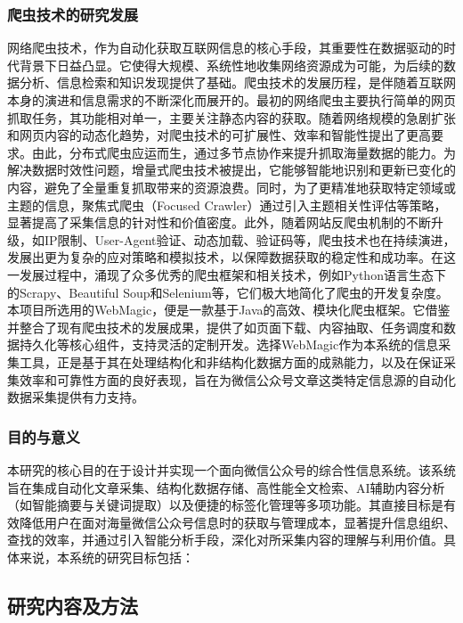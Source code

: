 \documentclass[a4paper,12pt]{ctexart}
\newcommand{\wuhao}{\fontsize{10.5pt}{15.75pt}\selectfont} %
\begin{document}
\subsubsection{爬虫技术的研究发展}
\songti\wuhao
网络爬虫技术，作为自动化获取互联网信息的核心手段，其重要性在数据驱动的时代背景下日益凸显。它使得大规模、系统性地收集网络资源成为可能，为后续的数据分析、信息检索和知识发现提供了基础。爬虫技术的发展历程，是伴随着互联网本身的演进和信息需求的不断深化而展开的。最初的网络爬虫主要执行简单的网页抓取任务，其功能相对单一，主要关注静态内容的获取\cite{ref5}。随着网络规模的急剧扩张和网页内容的动态化趋势，对爬虫技术的可扩展性、效率和智能性提出了更高要求。由此，分布式爬虫应运而生，通过多节点协作来提升抓取海量数据的能力\cite{ref3}。为解决数据时效性问题，增量式爬虫技术被提出，它能够智能地识别和更新已变化的内容，避免了全量重复抓取带来的资源浪费。同时，为了更精准地获取特定领域或主题的信息，聚焦式爬虫（Focused Crawler）通过引入主题相关性评估等策略，显著提高了采集信息的针对性和价值密度\cite{ref1}。此外，随着网站反爬虫机制的不断升级，如IP限制、User-Agent验证、动态加载、验证码等，爬虫技术也在持续演进，发展出更为复杂的应对策略和模拟技术，以保障数据获取的稳定性和成功率\cite{ref2}。在这一发展过程中，涌现了众多优秀的爬虫框架和相关技术，例如Python语言生态下的Scrapy、Beautiful Soup和Selenium等，它们极大地简化了爬虫的开发复杂度。本项目所选用的WebMagic，便是一款基于Java的高效、模块化爬虫框架。它借鉴并整合了现有爬虫技术的发展成果，提供了如页面下载、内容抽取、任务调度和数据持久化等核心组件，支持灵活的定制开发。选择WebMagic作为本系统的信息采集工具，正是基于其在处理结构化和非结构化数据方面的成熟能力，以及在保证采集效率和可靠性方面的良好表现，旨在为微信公众号文章这类特定信息源的自动化数据采集提供有力支持\cite{ref10}。

\subsubsection{目的与意义}
\songti\wuhao
本研究的核心目的在于设计并实现一个面向微信公众号的综合性信息系统。该系统旨在集成自动化文章采集、结构化数据存储、高性能全文检索、AI辅助内容分析（如智能摘要与关键词提取）以及便捷的标签化管理等多项功能。其直接目标是有效降低用户在面对海量微信公众号信息时的获取与管理成本，显著提升信息组织、查找的效率，并通过引入智能分析手段，深化对所采集内容的理解与利用价值。具体来说，本系统的研究目标包括：

\subsection{研究内容及方法}
\end{document}
